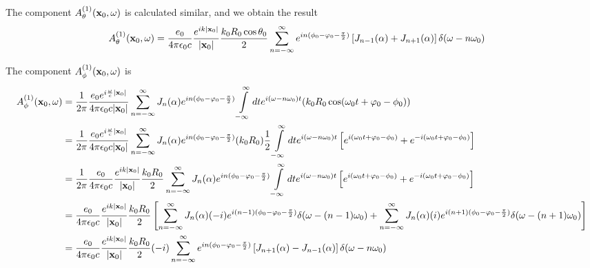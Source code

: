 The component $A_\theta^{(1)}({\bf x}_0,\omega)$ is calculated similar, and we obtain the result
\begin{align}
    {A}_\theta^{(1)}({\bf x}_0,\omega) & =\frac{e_0}{4\pi\epsilon_0c}\frac{e^{ik|{\bf x}_0|}}{|{\bf x}_0|}\frac{k_0R_0\cos\theta_0}{2}\sum\limits_{n=-\infty}^{\infty}e^{in(\phi_0-\varphi_0-\frac{\pi}2)}\left[J_{n-1}(\alpha)+J_{n+1}(\alpha)\right]\delta(\omega-n\omega_0)
\end{align}

The component $A_\phi^{(1)}({\bf x}_0,\omega)$ is
\begin{align}
    {A}_\phi^{(1)}({\bf x}_0,\omega) & =\frac1{2\pi}\frac{e_0 e^{i\frac{\omega}c|{\bf x}_0|}}{4\pi\epsilon_0c|{\bf x}_0|}\sum\limits_{n=-\infty}^{\infty}J_n(\alpha) e^{in(\phi_0-\varphi_0-\frac{\pi}2)}\int\limits_{-\infty}^{\infty}dt e^{i(\omega-n\omega_0)t}(k_0 R_0\cos(\omega_0 t+\varphi_0-\phi_0))\nonumber                                                                  \\
                                     & =\frac1{2\pi}\frac{e_0 e^{i\frac{\omega}c|{\bf x}_0|}}{4\pi\epsilon_0c|{\bf x}_0|}\sum\limits_{n=-\infty}^{\infty}J_n(\alpha) e^{in(\phi_0-\varphi_0-\frac{\pi}2)}(k_0R_0)\frac1{2}\int\limits_{-\infty}^{\infty}dt e^{i(\omega-n\omega_0)t}\left[e^{i(\omega_0 t+\varphi_0-\phi_0)}+e^{-i(\omega_0 t+\varphi_0-\phi_0)}\right]\nonumber        \\
                                     & =\frac1{2\pi}\frac{e_0}{4\pi\epsilon_0c}\frac{e^{ik|{\bf x}_0|}}{|{\bf x}_0|}\frac{k_0R_0}{2}\sum\limits_{n=-\infty}^{\infty}J_n(\alpha) e^{in(\phi_0-\varphi_0-\frac{\pi}2)}\int\limits_{-\infty}^{\infty}dt e^{i(\omega-n\omega_0)t}\left[e^{i(\omega_0 t+\varphi_0-\phi_0)}+e^{-i(\omega_0 t+\varphi_0-\phi_0)}\right]\nonumber              \\
                                     & =\frac{e_0}{4\pi\epsilon_0c}\frac{e^{ik|{\bf x}_0|}}{|{\bf x}_0|}\frac{k_0R_0}{2}\left[\sum\limits_{n=-\infty}^{\infty}J_n(\alpha) (-i)e^{i(n-1)(\phi_0-\varphi_0-\frac{\pi}2)}\delta(\omega-(n-1)\omega_0)+\sum\limits_{n=-\infty}^{\infty}J_n(\alpha) (i)e^{i(n+1)(\phi_0-\varphi_0-\frac{\pi}2)}\delta(\omega-(n+1)\omega_0)\right]\nonumber \\
                                     & =\frac{e_0}{4\pi\epsilon_0c}\frac{e^{ik|{\bf x}_0|}}{|{\bf x}_0|}\frac{k_0R_0}{2}(-i)\sum\limits_{n=-\infty}^{\infty}e^{in(\phi_0-\varphi_0-\frac{\pi}2)}\left[J_{n+1}(\alpha)-J_{n-1}(\alpha)\right]\delta(\omega-n\omega_0)
\end{align}

